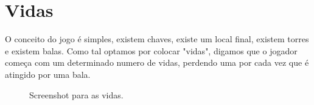 \section{Vidas}
O conceito do jogo é simples, existem chaves, existe um local final, existem torres e existem balas. Como tal optamos por colocar "vidas", digamos que o jogador começa com um determinado numero de vidas, perdendo uma por cada vez que é atingido por uma bala.

\begin{figure}[here]
                 \caption{Screenshot para as vidas.}
                 \label{fig:prototype}
\end{figure}